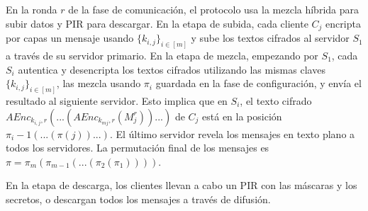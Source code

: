 \begin{enumerate}
En la ronda $r$ de la fase de comunicación, el protocolo usa la mezcla híbrida para subir datos y PIR para descargar. En la etapa de subida, cada cliente $C_j$ encripta por capas un mensaje usando $\{k_{i,j}\}_{i \in [m]}$ y sube los textos cifrados al servidor $S_1$ a través de su servidor primario. En la etapa de mezcla, empezando por $S_1$, cada $S_i$ autentica y desencripta los textos cifrados utilizando las mismas claves $\{k_{i,j}\}_{i \in [m]}$, las mezcla usando $\pi_i$ guardada en
la fase de configuración, y envía el resultado al siguiente servidor. 
Esto implica que en $S_i$, el texto cifrado $A Enc_{k_{i,j},r}(...(A Enc_{k_{mj},r}(M_j ^r))...)$ de $C_j$ está en la posición
$\pi_i-1(...(\pi(j))...)$. El último servidor revela los mensajes en texto plano a todos los servidores. La permutación final de los mensajes es $\pi = \pi_m(\pi_{m-1}(...(\pi_2(\pi_1))))$.

En la etapa de descarga, los clientes llevan a cabo un PIR con las máscaras y los secretos, o descargan todos los mensajes a través de difusión.


\end{enumerate}
